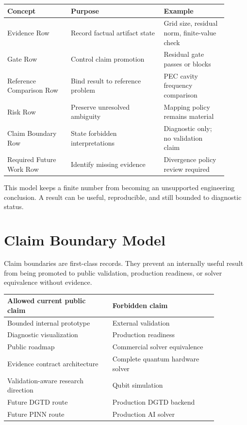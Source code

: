 \documentclass[11pt,a4paper]{article}
\begin{document}
\begin{center}
\begin{tabular}{p{0.26\linewidth}p{0.38\linewidth}p{0.26\linewidth}}
\toprule
Concept & Purpose & Example \\
\midrule
Evidence Row & Record factual artifact state & Grid size, residual norm, finite-value check \\
Gate Row & Control claim promotion & Residual gate passes or blocks \\
Reference Comparison Row & Bind result to reference problem & PEC cavity frequency comparison \\
Risk Row & Preserve unresolved ambiguity & Mapping policy remains material \\
Claim Boundary Row & State forbidden interpretations & Diagnostic only; no validation claim \\
Required Future Work Row & Identify missing evidence & Divergence policy review required \\
\bottomrule
\end{tabular}
\end{center}

This model keeps a finite number from becoming an unsupported engineering conclusion. A result can be useful, reproducible, and still bounded to diagnostic status.

\section{Claim Boundary Model}

Claim boundaries are first-class records. They prevent an internally useful result from being promoted to public validation, production readiness, or solver equivalence without evidence.

\begin{center}
\begin{tabular}{p{0.43\linewidth}p{0.43\linewidth}}
\toprule
Allowed current public claim & Forbidden claim \\
\midrule
Bounded internal prototype & External validation \\
Diagnostic visualization & Production readiness \\
Public roadmap & Commercial solver equivalence \\
Evidence contract architecture & Complete quantum hardware solver \\
Validation-aware research direction & Qubit simulation \\
Future DGTD route & Production DGTD backend \\
Future PINN route & Production AI solver \\
\bottomrule
\end{tabular}
\end{center}
\end{document}

